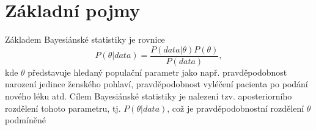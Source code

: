 \chapter{Základní pojmy}

Základem Bayesiánské statistiky je rovnice
\begin{equation}
P(\theta | data) = \frac{P(data | \theta) P(\theta)}{P(data)},
\end{equation}
kde $\theta$ představuje hledaný populační parametr jako např. pravděpodobnost narození jedince ženského pohlaví, pravděpodobnost vyléčení pacienta po podání nového léku atd. Cílem Bayesiánské statistiky je nalezení tzv. aposteriorního rozdělení tohoto parametru, tj. $P(\theta | data)$, což je pravděpodobnostní rozdělení $\theta$ podmíněné 